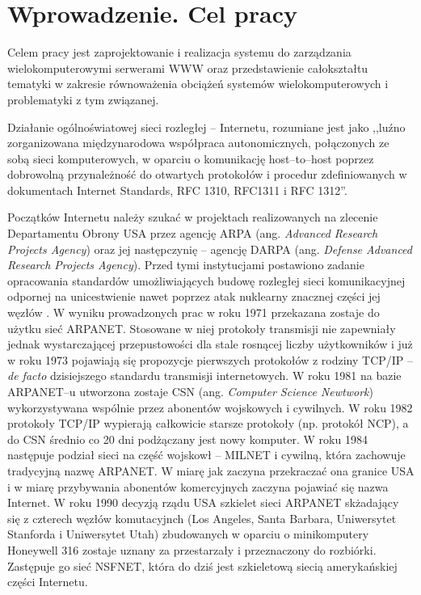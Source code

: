 \chapter{Wprowadzenie. Cel pracy}
\label{r01}
Celem pracy jest zaprojektowanie i realizacja systemu do zarządzania wielokomputerowymi
serwerami WWW oraz przedstawienie całokształtu tematyki w zakresie równoważenia obciążeń
systemów wielokomputerowych i problematyki z tym związanej.

Działanie ogólnoświatowej sieci rozległej -- Internetu, rozumiane jest jako ,,luźno zorganizowana
międzynarodowa współpraca autonomicznych, połączonych ze sobą sieci komputerowych, w oparciu o komunikację
host--to--host poprzez dobrowolną przynależność do otwartych protokołów i procedur zdefiniowanych w dokumentach
Internet Standards, RFC 1310, RFC1311 i  RFC 1312''.

Początków Internetu należy szukać w projektach realizowanych na zlecenie Departamentu Obrony USA przez agencję
ARPA (ang. \emph{Advanced Research Projects Agency}) oraz jej następczynię -- agencję DARPA (ang. \emph{Defense Advanced
Research Projects Agency}). Przed tymi instytucjami postawiono zadanie opracowania standardów umożliwiających
budowę rozległej sieci komunikacyjnej odpornej na unicestwienie nawet poprzez atak nuklearny znacznej części
jej węzłów \cite{barylo1}. W wyniku prowadzonych prac w roku 1971 przekazana zostaje do użytku sieć ARPANET. Stosowane w niej
protokoły transmisji nie zapewniały jednak wystarczającej przepustowości dla stale rosnącej liczby użytkowników
i już w roku 1973 pojawiają się propozycje pierwszych protokołów z rodziny TCP/IP -- \emph{de facto} dzisiejszego
standardu transmisji internetowych. W roku 1981 na bazie ARPANET--u utworzona zostaje CSN (ang. \emph{Computer Science
Newtwork})  wykorzystywana wspólnie przez abonentów wojskowych i cywilnych. W roku 1982
protokoły TCP/IP wypierają całkowicie starsze protokoły (np. protokół NCP),  a do CSN średnio co 20 dni
podżączany jest nowy komputer. W roku 1984 następuje podział sieci na część wojskowł -- MILNET i cywilną,
która zachowuje tradycyjną nazwę ARPANET. W miarę jak zaczyna przekraczać ona granice USA i w miarę przybywania
abonentów komercyjnych zaczyna pojawiać się nazwa Internet. W roku 1990 decyzją rządu USA szkielet sieci ARPANET
skżadający się z  czterech węzłów komutacyjnch (Los Angeles, Santa Barbara, Uniwersytet Stanforda i Uniwersytet
Utah) zbudowanych w oparciu o minikomputery Honeywell 316 zostaje uznany za przestarzały i przeznaczony do
rozbiórki. Zastępuje go sieć NSFNET, która do dziś jest szkieletową siecią amerykańskiej części Internetu.

